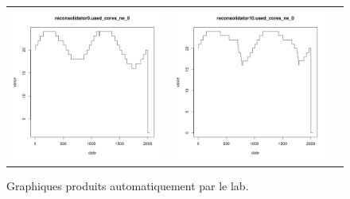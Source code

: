 \documentclass[parallelisme]{compas2017}
\begin{document}
\begin{figure}[]
	
	\caption{Graphiques produits automatiquement par le lab.}
	\begin{tabular}{ccc}
\includegraphics[scale=0.30]{reconsolidator0_used_cores_ne_0}&
\includegraphics[scale=0.30]{reconsolidator10_used_cores_ne_0}&

\end{tabular}
\end{figure}
\end{document}
